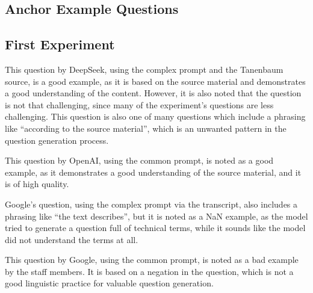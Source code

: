 \documentclass[twoside, 11pt]{article}
\begin{document}
\begin{appendices}
    \section{Anchor Example Questions}

    \subsection{First Experiment}

    This question by DeepSeek, using the complex prompt and the Tanenbaum source, is a good example, as it is based on the source material and demonstrates a good understanding of the content. However, it is also noted that the question is not that challenging, since many of the experiment's questions are less challenging. This question is also one of many questions which include a phrasing like \enquote{according to the source material}, which is an unwanted pattern in the question generation process.
    \vp

    This question by OpenAI, using the common prompt, is noted as a good example, as it demonstrates a good understanding of the source material, and it is of high quality.
    \vp

    Google's question, using the complex prompt via the transcript, also includes a phrasing like \enquote{the text describes}, but it is noted as a NaN example, as the model tried to generate a question full of technical terms, while it sounds like the model did not understand the terms at all.
    \vp

    This question by Google, using the common prompt, is noted as a bad example by the staff members. It is based on a negation in the question, which is not a good linguistic practice for valuable question generation.
    \vp


\end{appendices}
\end{document}
